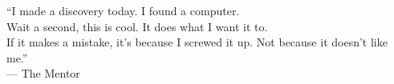 
\cleardoublepage
{}
\thispagestyle{empty}

\vspace*{3cm}

\begin{center}
    ``I made a discovery today.  I found a computer. \\
    Wait a second, this is cool.  It does what I want it to. \\
    If it makes a mistake, it's because I screwed it up.  Not because it doesn't like me.'' \\ \medskip
--- The Mentor    
\end{center}

\medskip

